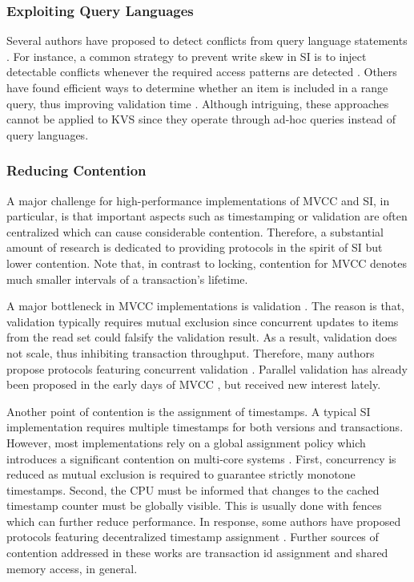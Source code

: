 \subsubsection{Exploiting Query Languages}

Several authors have proposed to detect conflicts from query language statements
\cite{fekete2005making, faleiro2015rethinking, neumann2015fast}. For instance, a
common strategy to prevent write skew in SI is to inject detectable conflicts
whenever the required access patterns are detected \cite{fekete2005making}.
Others have found efficient ways to determine whether an item is included in a
range query, thus improving validation time \cite{neumann2015fast}. Although
intriguing, these approaches cannot be applied to KVS since they operate through
ad-hoc queries instead of query languages.

\subsubsection{Reducing Contention}

A major challenge for high-performance implementations of MVCC and SI, in
particular, is that important aspects such as timestamping or validation are
often centralized which can cause considerable contention. Therefore, a
substantial amount of research is dedicated to providing protocols in the spirit
of SI but lower contention. Note that, in contrast to locking, contention for
MVCC denotes much smaller intervals of a transaction's lifetime.

A major bottleneck in MVCC implementations is validation \cite{tu2013speedy,
bailey2013exploring, ding2015centiman, faleiro2015rethinking,
wang2017efficiently, zhou2017posterior}. The reason is that, validation
typically requires mutual exclusion since concurrent updates to items from the
read set could falsify the validation result. As a result, validation does not
scale, thus inhibiting transaction throughput. Therefore, many authors propose
protocols featuring concurrent validation \cite{bailey2013exploring,
ding2015centiman, faleiro2015rethinking, wang2017efficiently}. Parallel
validation has already been proposed in the early days of MVCC
\cite{kung1981optimistic}, but received new interest lately.

Another point of contention is the assignment of timestamps. A typical SI
implementation requires multiple timestamps for both versions and transactions.
However, most implementations rely on a global assignment policy which
introduces a significant contention on multi-core systems \cite{tu2013speedy,
zhou2017posterior}. First, concurrency is reduced as mutual exclusion is
required to guarantee strictly monotone timestamps. Second, the CPU must be
informed that changes to the cached timestamp counter must be globally visible.
This is usually done with fences which can further reduce performance. In
response, some authors have proposed protocols featuring decentralized timestamp
assignment \cite{tu2013speedy, zhou2017posterior}. Further sources of contention
addressed in these works are transaction id assignment and shared memory access,
in general.
